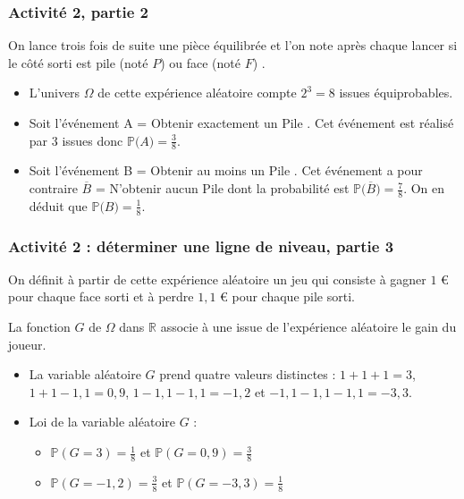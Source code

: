 \documentclass[11pt, hyperref={urlcolor=red,%
            linkcolor=blue, %
            colorlinks=true}]{beamer}
\newcommand{\R}{\mathbb{R}}
\newcommand{\proba}[1]{\mathbb{P}\big(#1\big)}
\begin{document}
\begin{frame}
\frametitle{Activité 2, partie 2}


On lance trois fois de suite une pièce équilibrée et l'on note après chaque lancer si le côté sorti est  pile (noté $P$) ou  face (noté $F$) .

\begin{itemize}
\pause \item L'univers $\Omega$ de cette expérience aléatoire compte $2^{3}=8$ issues équiprobables.
\pause \item Soit l'événement A = \og{} Obtenir exactement un Pile \fg{}. Cet événement est réalisé par $3$ issues donc $\proba{A}=\frac{3}{8}$.
\pause \item Soit l'événement B = \og{} Obtenir au moins un Pile \fg{}. Cet événement a pour contraire $\overline{B}$ = \og{} N'obtenir aucun Pile \fg{} dont la probabilité est  $\proba{\overline{B}}=\frac{7}{8}$. On en déduit que $\proba{B}=\frac{1}{8}$.

\end{itemize}  


\end{frame}


\begin{frame}
\frametitle{Activité 2 : déterminer une ligne de niveau, partie 3}


On définit à partir de  cette expérience aléatoire un jeu qui consiste  à gagner $1$ €  pour chaque face sorti  et à perdre $1,1$ € pour chaque pile sorti.

La fonction  $G$ de $\Omega$ dans $\R$ associe à une issue de l'expérience aléatoire  le gain du joueur.

\begin{itemize}
\pause \item La variable aléatoire $G$ prend quatre valeurs distinctes : $1+1+1=3$, $1+1-1,1=0,9$, $1-1,1-1,1=-1,2$ et $-1,1-1,1-1,1=-3,3$.
\pause \item Loi de la variable aléatoire $G$ :
  \begin{itemize}
\pause \item  $\mathbb{P}(G = 3)= \frac{1}{8}$ et  $\mathbb{P}(G = 0,9)= \frac{3}{8}$
 \pause \item  $\mathbb{P}(G = -1,2)= \frac{3}{8}$ et  $\mathbb{P}(G = -3,3)= \frac{1}{8}$
\end{itemize}  
\end{itemize} 

\end{frame}
\end{document}
